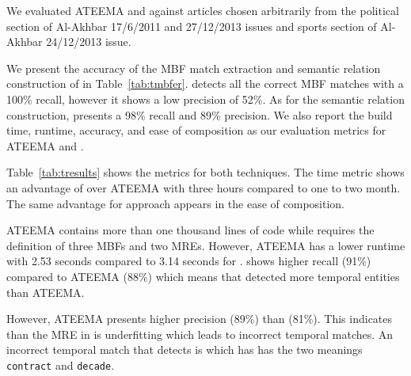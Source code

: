 \begin{appendices}
\begin{table}[tb!]
  \centering
  \caption{\framework~against ATEEMA: Time, accuracy, and ease of composition}
  \label{tab:tresults}%
\end{table}%

We evaluated ATEEMA and \framework against articles chosen arbitrarily from the political section of 
Al-Akhbar 17/6/2011 and 27/12/2013 issues and sports section of Al-Akhbar 24/12/2013 issue. 

We present the accuracy of the MBF match extraction and semantic relation construction of \framework in Table~\ref{tab:tmbfer}. 
\framework detects all the correct MBF matches with a 100\% recall, however it shows a low precision of 52\%. 
As for the semantic relation construction, \framework presents a 98\% recall and 89\% precision. 
We also report the build time, runtime, accuracy, and ease of composition as our evaluation metrics for ATEEMA and \framework. 

Table~\ref{tab:tresults} shows the metrics for both techniques. 
The time metric shows an advantage of \framework over ATEEMA with three hours compared to one to two month. 
The same advantage for \framework approach appears in the ease of composition. 

ATEEMA contains more than one thousand lines of code while \framework requires the definition of three MBFs and two MREs. 
However, ATEEMA has a lower runtime with 2.53 seconds compared to 3.14 seconds for \framework. 
\framework shows higher recall (91\%)  compared to ATEEMA (88\%) which means 
that \framework detected more temporal entities than ATEEMA. 

However, ATEEMA presents higher precision (89\%) than \framework (81\%). 
This indicates than the MRE in \framework is underfitting which leads to incorrect temporal matches. 
An incorrect temporal match that \framework detects is  which has has the two meanings {\tt contract} and {\tt decade}.


\end{appendices}
